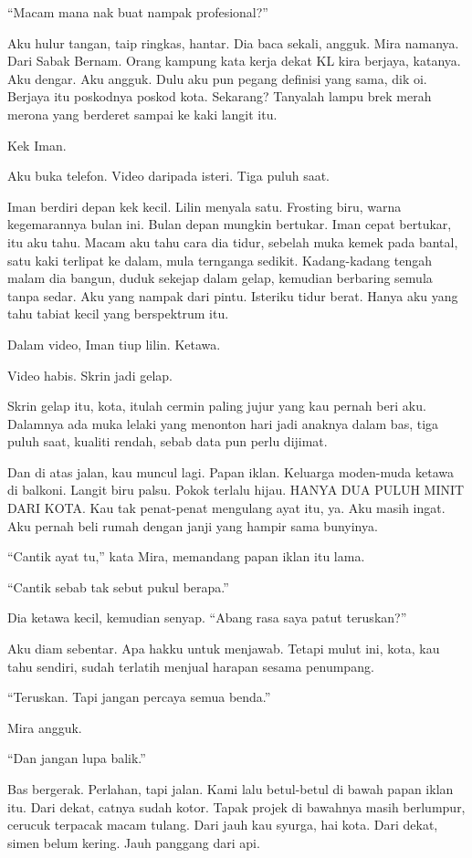 \documentclass[
  11pt,
  a5paper,
  openany,
  oneside]{book}
\begin{document}
``Macam mana nak buat nampak profesional?''

Aku hulur tangan, taip ringkas, hantar. Dia baca sekali, angguk. Mira
namanya. Dari Sabak Bernam. Orang kampung kata kerja dekat KL kira
berjaya, katanya. Aku dengar. Aku angguk. Dulu aku pun pegang definisi
yang sama, dik oi. Berjaya itu poskodnya poskod kota. Sekarang? Tanyalah
lampu brek merah merona yang berderet sampai ke kaki langit itu.

Kek Iman.

Aku buka telefon. Video daripada isteri. Tiga puluh saat.

Iman berdiri depan kek kecil. Lilin menyala satu. Frosting biru, warna
kegemarannya bulan ini. Bulan depan mungkin bertukar. Iman cepat
bertukar, itu aku tahu. Macam aku tahu cara dia tidur, sebelah muka
kemek pada bantal, satu kaki terlipat ke dalam, mula ternganga sedikit.
Kadang-kadang tengah malam dia bangun, duduk sekejap dalam gelap,
kemudian berbaring semula tanpa sedar. Aku yang nampak dari pintu.
Isteriku tidur berat. Hanya aku yang tahu tabiat kecil yang berspektrum
itu.

Dalam video, Iman tiup lilin. Ketawa.

Video habis. Skrin jadi gelap.

Skrin gelap itu, kota, itulah cermin paling jujur yang kau pernah beri
aku. Dalamnya ada muka lelaki yang menonton hari jadi anaknya dalam bas,
tiga puluh saat, kualiti rendah, sebab data pun perlu dijimat.

Dan di atas jalan, kau muncul lagi. Papan iklan. Keluarga moden-muda
ketawa di balkoni. Langit biru palsu. Pokok terlalu hijau. HANYA DUA
PULUH MINIT DARI KOTA. Kau tak penat-penat mengulang ayat itu, ya. Aku
masih ingat. Aku pernah beli rumah dengan janji yang hampir sama
bunyinya.

``Cantik ayat tu,'' kata Mira, memandang papan iklan itu lama.

``Cantik sebab tak sebut pukul berapa.''

Dia ketawa kecil, kemudian senyap. ``Abang rasa saya patut teruskan?''

Aku diam sebentar. Apa hakku untuk menjawab. Tetapi mulut ini, kota, kau
tahu sendiri, sudah terlatih menjual harapan sesama penumpang.

``Teruskan. Tapi jangan percaya semua benda.''

Mira angguk.

``Dan jangan lupa balik.''

Bas bergerak. Perlahan, tapi jalan. Kami lalu betul-betul di bawah papan
iklan itu. Dari dekat, catnya sudah kotor. Tapak projek di bawahnya
masih berlumpur, cerucuk terpacak macam tulang. Dari jauh kau syurga,
hai kota. Dari dekat, simen belum kering. Jauh panggang dari api.
\end{document}
